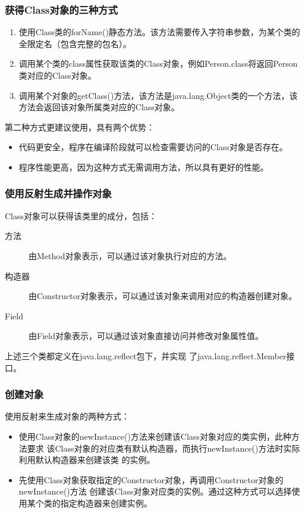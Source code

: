 \begin{frame}[fragile] %
\frametitle{获得Class对象的三种方式}

\begin{enumerate}
\item 使用Class类的forName()静态方法。该方法需要传入字符串参数，为某个类的全限定名（包含完整的包名）。
\item 调用某个类的class属性获取该类的Class对象，例如Person.class将返回Person类对应的Class对象。
\item 调用某个对象的getClass()方法，该方法是java.lang.Object类的一个方法，该方法会返回该对象所属类对应的Class对象。
\end{enumerate}

第二种方式更建议使用，具有两个优势：
\begin{itemize}\kai
\item 代码更安全，程序在编译阶段就可以检查需要访问的Class对象是否存在。
\item 程序性能更高，因为这种方式无需调用方法，所以具有更好的性能。
\end{itemize}
\end{frame}

\begin{frame}[fragile] %
\frametitle{使用反射生成并操作对象}

Class对象可以获得该类里的成分，包括：

\begin{description}
\item[方法] 由Method对象表示，可以通过该对象执行对应的方法。
\item[构造器] 由Constructor对象表示，可以通过该对象来调用对应的构造器创建对象。
\item[Field] 由Field对象表示，可以通过该对象直接访问并修改对象属性值。
\end{description}

{\Red\small 上述三个类都定义在java.lang.reflect包下，并实现
了java.lang.reflect.Member接口。}

\end{frame}

\begin{frame}[fragile] %
\frametitle{创建对象}

使用反射来生成对象的两种方式：

\begin{itemize}
\item 使用Class对象的newInstance()方法来创建该Class对象对应的类实例，此种方法要求
  该Class对象的对应类有默认构造器，而执行newInstance()方法时实际利用默认构造器来创建该类
  的实例。
\item 先使用Class对象获取指定的Constructor对象，再调用Constructor对象的newInstance()方法
  创建该Class对象对应类的实例。通过这种方式可以选择使用某个类的指定构造器来创建实例。
\end{itemize}
\end{frame}

